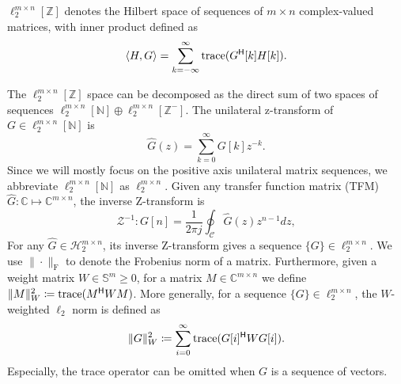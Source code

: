 \(\ell_2^{m\times n}[\mathbb{Z}]\) denotes the Hilbert space of sequences of \(m\times n\) complex-valued matrices, with inner product defined as
\[
\langle H,G\rangle = \sum_{k=-\infty}^{\infty} \mathrm{trace}(G^{\mathsf{H}}[k]H[k]).
\]



The \(\ell_2^{m\times n}[\mathbb{Z}]\) space can be decomposed as the direct sum of two spaces of sequences \(\ell_2^{m\times n}[\mathbb{N}] \oplus \ell_2^{m\times n}[\mathbb{Z}^-]\).
The unilateral z-transform of \(G\in \ell_2^{m\times n}[\mathbb{N}]\) is
\[
\hat{G}(z) = \sum_{k=0}^\infty G[k] z^{-k}.
\]
Since we will mostly focus on the positive axis unilateral matrix sequences, we abbreviate \(\ell_2^{m\times n}[\mathbb{N}]\) as \(\ell_2^{m\times n}\). 
Given any transfer function matrix (TFM) \(\hat{G}:\mathbb{C}\mapsto \mathbb{C}^{m\times n}\), the inverse Z-transform is
\[
\mathcal{Z}^{-1}:G[n] = \frac{1}{2\pi j} \oint_\mathcal{C} \hat{G}(z)z^{n-1} dz, 
\]
For any \(\hat{G}\in\mathcal{H}_2^{m\times n}\), its inverse Z-transform gives a sequence \(\{G\}\in\ell_2^{m\times n}\). We use \(\|\cdot\|_\mathrm{F}\) to denote the Frobenius norm of a matrix. 
Furthermore, given a weight matrix \(W \in \mathbb{S}^{m} \ge 0\), for a matrix \(M \in \mathbb{C}^{m \times n}\) we define
\(\|M\|_W^2 \coloneqq \mathrm{trace}(M^{\mathsf{H}} W M)\). More generally, for a sequence \(\{G\}\in\ell_2^{m\times n}\), the \(W\)-weighted \(\ell_2\) norm is defined as
\[
\|G\|_W^2 \coloneqq \sum_{i=0}^{\infty} \mathrm{trace}(G[i]^{\mathsf{H}} W G[i]).
\]
Especially, the trace operator can be omitted when \(G\) is a sequence of vectors.





